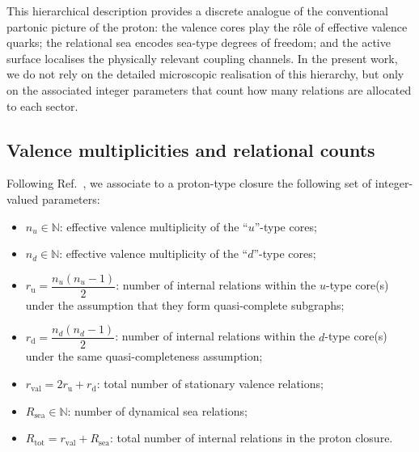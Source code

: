 \documentclass[11pt,a4paper]{article}
\theoremstyle{definition}
\begin{document}
This hierarchical description provides a discrete analogue of the conventional partonic picture of the proton: the valence cores play the rôle of effective valence quarks; the relational sea encodes sea-type degrees of freedom; and the active surface localises the physically relevant coupling channels.\cite{Combinatorial_Proton_v2_2026,PDL_Global_Mapping_2026} In the present work, we do not rely on the detailed microscopic realisation of this hierarchy, but only on the associated integer parameters that count how many relations are allocated to each sector.

\subsection{Valence multiplicities and relational counts}

Following Ref.~\cite{Combinatorial_Proton_v2_2026}, we associate to a proton-type closure the following set of integer-valued parameters:
\begin{itemize}
  \item $n_u\in \mathbb{N}$: effective valence multiplicity of the ``$u$''-type cores;
  \item $n_d\in \mathbb{N}$: effective valence multiplicity of the ``$d$''-type cores;
  \item $r_{\mathrm{u}} = \dfrac{n_u(n_u-1)}{2}$: number of internal relations within the $u$-type core(s) under the assumption that they form quasi-complete subgraphs;
  \item $r_{\mathrm{d}} = \dfrac{n_d(n_d-1)}{2}$: number of internal relations within the $d$-type core(s) under the same quasi-completeness assumption;
  \item $r_{\mathrm{val}} = 2 r_{\mathrm{u}} + r_{\mathrm{d}}$: total number of stationary valence relations;
  \item $R_{\mathrm{sea}}\in \mathbb{N}$: number of dynamical sea relations;
  \item $R_{\mathrm{tot}} = r_{\mathrm{val}} + R_{\mathrm{sea}}$: total number of internal relations in the proton closure.
\end{itemize}
\end{document}
